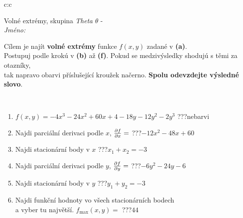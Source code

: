 \documentclass[10pt]{report}
\begin{document}
\newpage
\thispagestyle{empty}
\begin{tabular}{c:c}
\begin{minipage}[c][104.5mm][t]{0.5\linewidth}
\begin{center}
\vspace{7mm}
{\huge Volné extrémy, skupina \textit{Theta $\theta$} -}\\[5mm]
\textit{Jméno:}\phantom{xxxxxxxxxxxxxxxxxxxxxxxxxxxxxxxxxxxxxxxxxxxxxxxxxxxxxxxxxxxxxxxxx}\\[5mm]
\begin{minipage}{0.95\linewidth}
\begin{center}
Cílem je najít \textbf{volné extrémy} funkce $f(x,y)$ zadané v \textbf{(a)}.\\Postupuj podle krokú v \textbf{(b)} až \textbf{(f)}. Pokud se medzivýsledky shodujú s těmi za otazníky,\\tak napravo obarvi příslušející kroužek načerno. \textbf{Spolu odevzdejte výsledné slovo}.
\end{center}
\end{minipage}
\\[1mm]
\begin{minipage}{0.79\linewidth}
\begin{center}
\begin{varwidth}{\linewidth}
\begin{enumerate}
\normalsize
\item $f(x,y)=-4x^3-24x^2+60x+4-18y-12y^2-2y^3$\quad \dotfill\; ???\;\dotfill \quad nebarvi
\item Najdi parciální derivaci podle $x$, $\pdv{f}{x}=$\quad \dotfill\; ???\;\dotfill \quad $-12x^2-48x+60$
\item Najdi stacionární body v $x$\quad \dotfill\; ???\;\dotfill \quad $x_1+x_2=-3$
\item Najdi parciální derivaci podle $y$, $\pdv{f}{y}=$\quad \dotfill\; ???\;\dotfill \quad $-6y^2-24y-6$
\item Najdi stacionární body v $y$\quad \dotfill\; ???\;\dotfill \quad $y_1+y_2=-3$
\item Najdi funkční hodnoty vo všech stacionárních bodech \\ \phantom{xxxxxx} a vyber tu najvětší. $f_{\text{max}}(x,y)=$\quad \dotfill\; ???\;\dotfill \quad $44$
\end{enumerate}
\end{varwidth}
\end{center}
\end{minipage}
\begin{minipage}{0.20\linewidth}

\end{minipage}
\end{center}
\end{minipage}
\end{tabular}
\end{document}
